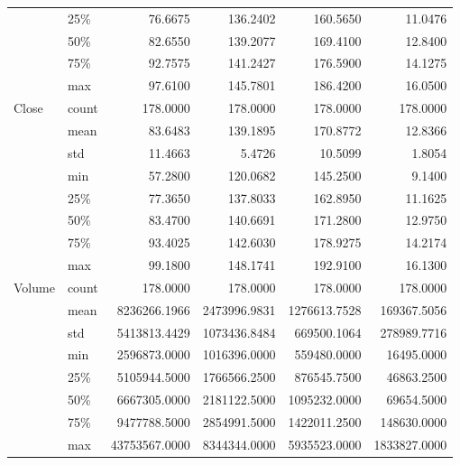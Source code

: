 \documentclass[11pt]{article} %
\begin{document}
\begin{table}[hbt!]
\begin{tabular}{llrrrr}
       & 25\% &       76.6675 &     136.2402 &     160.5650 &      11.0476 \\
       & 50\% &       82.6550 &     139.2077 &     169.4100 &      12.8400 \\
       & 75\% &       92.7575 &     141.2427 &     176.5900 &      14.1275 \\
       & max &       97.6100 &     145.7801 &     186.4200 &      16.0500 \\
Close & count &      178.0000 &     178.0000 &     178.0000 &     178.0000 \\
       & mean &       83.6483 &     139.1895 &     170.8772 &      12.8366 \\
       & std &       11.4663 &       5.4726 &      10.5099 &       1.8054 \\
       & min &       57.2800 &     120.0682 &     145.2500 &       9.1400 \\
       & 25\% &       77.3650 &     137.8033 &     162.8950 &      11.1625 \\
       & 50\% &       83.4700 &     140.6691 &     171.2800 &      12.9750 \\
       & 75\% &       93.4025 &     142.6030 &     178.9275 &      14.2174 \\
       & max &       99.1800 &     148.1741 &     192.9100 &      16.1300 \\
Volume & count &      178.0000 &     178.0000 &     178.0000 &     178.0000 \\
       & mean &  8236266.1966 & 2473996.9831 & 1276613.7528 &  169367.5056 \\
       & std &  5413813.4429 & 1073436.8484 &  669500.1064 &  278989.7716 \\
       & min &  2596873.0000 & 1016396.0000 &  559480.0000 &   16495.0000 \\
       & 25\% &  5105944.5000 & 1766566.2500 &  876545.7500 &   46863.2500 \\
       & 50\% &  6667305.0000 & 2181122.5000 & 1095232.0000 &   69654.5000 \\
       & 75\% &  9477788.5000 & 2854991.5000 & 1422011.2500 &  148630.0000 \\
       & max & 43753567.0000 & 8344344.0000 & 5935523.0000 & 1833827.0000 \\
\bottomrule
\end{tabular}
\end{table}

\clearpage
\end{document}
